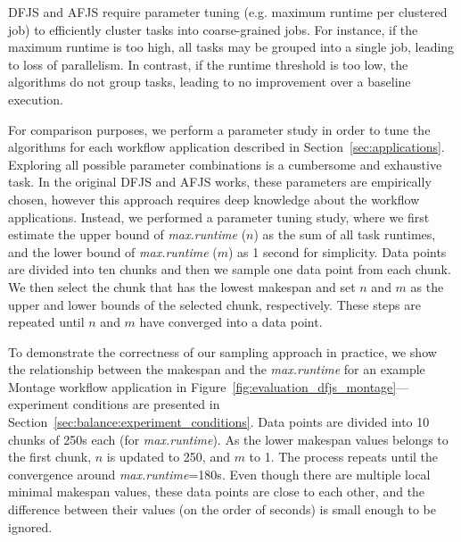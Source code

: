 DFJS and AFJS require parameter tuning (e.g. maximum runtime per clustered job) to efficiently cluster tasks into coarse-grained jobs. For instance, if the maximum runtime is too high, all tasks may be grouped into a single job, leading to loss of parallelism. In contrast, if the runtime threshold is too low, the algorithms do not group tasks, leading to no improvement over a baseline execution. 

For comparison purposes, we perform a parameter study in order to tune the algorithms for each workflow application described in Section~\ref{sec:applications}. Exploring all possible parameter combinations is a cumbersome and exhaustive task. In the original DFJS and AFJS works, these parameters are empirically chosen, however this approach requires deep knowledge about the workflow applications. Instead, we performed a parameter tuning study, where we first estimate the upper bound of \emph{max.runtime} ($n$) as the sum of all task runtimes, and the lower bound of \emph{max.runtime} ($m$) as 1 second for simplicity. Data points are divided into ten chunks and then we sample one data point from each chunk. We then select the chunk that has the lowest makespan and set $n$ and $m$ as the upper and lower bounds of the selected chunk, respectively. These steps are repeated until $n$ and $m$ have converged into a data point.


To demonstrate the correctness of our sampling approach in practice, we show the relationship between the makespan and the \emph{max.runtime} for an example Montage workflow application in Figure~\ref{fig:evaluation_dfjs_montage}---experiment conditions are presented in Section~\ref{sec:balance:experiment_conditions}. Data points are divided into 10 chunks of 250s each (for \emph{max.runtime}). As the lower makespan values belongs to the first chunk, $n$ is updated to 250, and $m$ to 1. The process repeats until the convergence around \emph{max.runtime}=180s. Even though there are multiple local minimal makespan values, these data points are close to each other, and the difference between their values (on the order of seconds) is small enough to be ignored.

